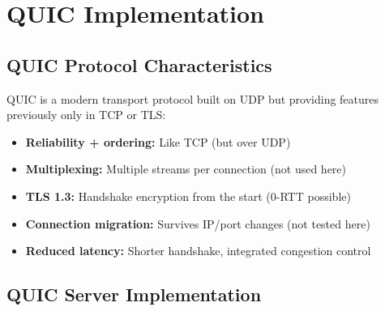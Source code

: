 \documentclass[12pt,a4paper]{article}
\begin{document}
\section{QUIC Implementation}
\label{sec:quic}

\subsection{QUIC Protocol Characteristics}

QUIC is a modern transport protocol built on UDP but providing features previously only in TCP or TLS:

\begin{tcolorbox}[colback=gray!5,colframe=quicgreen,title=QUIC Advantages]
\begin{itemize}
  \item \textbf{Reliability + ordering:} Like TCP (but over UDP)
  \item \textbf{Multiplexing:} Multiple streams per connection (not used here)
  \item \textbf{TLS 1.3:} Handshake encryption from the start (0-RTT possible)
  \item \textbf{Connection migration:} Survives IP/port changes (not tested here)
  \item \textbf{Reduced latency:} Shorter handshake, integrated congestion control
\end{itemize}
\end{tcolorbox}

\subsection{QUIC Server Implementation}
\end{document}
